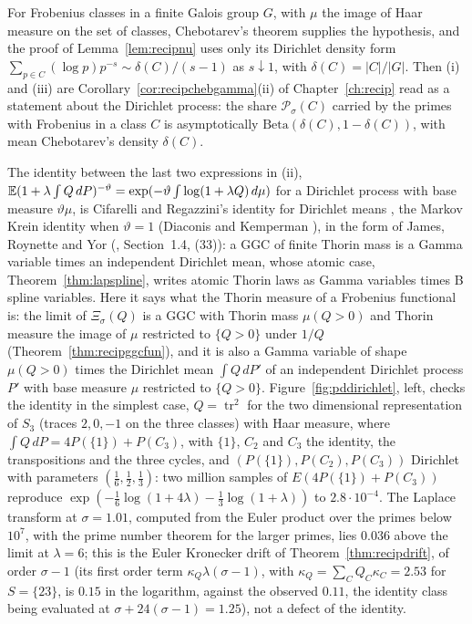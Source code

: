For Frobenius classes in a finite Galois group $G$, with $\mu$ the image of Haar measure on the set of classes, Chebotarev's theorem supplies the hypothesis, and the proof of Lemma~\ref{lem:recipnu} uses only its Dirichlet density form $\sum_{p\in C}(\log p)p^{-s}\sim\delta(C)/(s-1)$ as $s\downarrow1$, with $\delta(C)=|C|/|G|$. Then (i) and (iii) are Corollary~\ref{cor:recipchebgamma}(ii) of Chapter~\ref{ch:recip} read as a statement about the Dirichlet process: the share $\mathcal P_\sigma(C)$ carried by the primes with Frobenius in a class $C$ is asymptotically $\mathrm{Beta}(\delta(C),1-\delta(C))$, with mean Chebotarev's density $\delta(C)$.

The identity between the last two expressions in (ii), $\mathbb{E}(1+\lambda\int Q\,dP)^{-\vartheta}=\exp(-\vartheta\int\log(1+\lambda Q)\,d\mu)$ for a Dirichlet process with base measure $\vartheta\mu$, is Cifarelli and Regazzini's identity for Dirichlet means \cite{cifarelliregazzini1990}, the Markov Krein identity when $\vartheta=1$ (Diaconis and Kemperman \cite{diaconiskemperman1996}), in the form of James, Roynette and Yor (\cite{jamesroynetteyor2008}, Section~1.4, (33)): a GGC of finite Thorin mass is a Gamma variable times an independent Dirichlet mean, whose atomic case, Theorem~\ref{thm:lapspline}, writes atomic Thorin laws as Gamma variables times B spline variables. Here it says what the Thorin measure of a Frobenius functional is: the limit of $\Xi_\sigma(Q)$ is a GGC with Thorin mass $\mu(Q>0)$ and Thorin measure the image of $\mu$ restricted to $\{Q>0\}$ under $1/Q$ (Theorem~\ref{thm:recipggcfun}), and it is also a Gamma variable of shape $\mu(Q>0)$ times the Dirichlet mean $\int Q\,dP'$ of an independent Dirichlet process $P'$ with base measure $\mu$ restricted to $\{Q>0\}$. Figure~\ref{fig:pddirichlet}, left, checks the identity in the simplest case, $Q=\operatorname{tr}^2$ for the two dimensional representation of $S_3$ (traces $2,0,-1$ on the three classes) with Haar measure, where $\int Q\,dP=4P(\{1\})+P(C_3)$, with $\{1\}$, $C_2$ and $C_3$ the identity, the transpositions and the three cycles, and $(P(\{1\}),P(C_2),P(C_3))$ Dirichlet with parameters $(\frac16,\frac12,\frac13)$: two million samples of $E(4P(\{1\})+P(C_3))$ reproduce $\exp(-\frac16\log(1+4\lambda)-\frac13\log(1+\lambda))$ to $2.8\cdot10^{-4}$. The Laplace transform at $\sigma=1.01$, computed from the Euler product over the primes below $10^7$, with the prime number theorem for the larger primes, lies $0.036$ above the limit at $\lambda=6$; this is the Euler Kronecker drift of Theorem~\ref{thm:recipdrift}, of order $\sigma-1$ (its first order term $\kappa_Q\lambda(\sigma-1)$, with $\kappa_Q=\sum_CQ_C\kappa_C=2.53$ for $S=\{23\}$, is $0.15$ in the logarithm, against the observed $0.11$, the identity class being evaluated at $\sigma+24(\sigma-1)=1.25$), not a defect of the identity.

